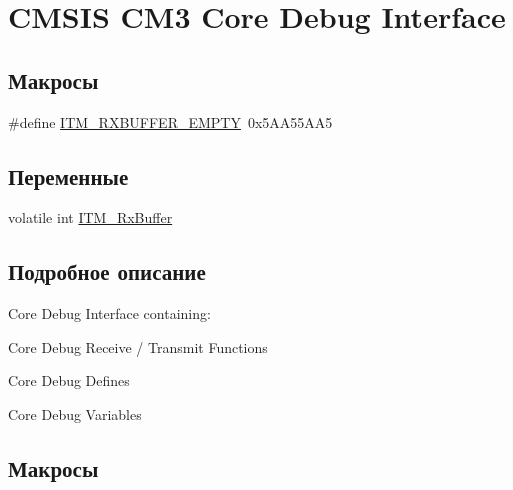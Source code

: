 \hypertarget{group___c_m_s_i_s___c_m3___core_debug_interface}{}\section{C\+M\+S\+IS C\+M3 Core Debug Interface}
\label{group___c_m_s_i_s___c_m3___core_debug_interface}
\subsection*{Макросы}
\begin{DoxyCompactItemize}
\item 
\#define \mbox{\hyperlink{group___c_m_s_i_s___c_m3___core_debug_interface_gaa822cb398ee022b59e9e6c5d7bbb228a}{I\+T\+M\+\_\+\+R\+X\+B\+U\+F\+F\+E\+R\+\_\+\+E\+M\+P\+TY}}~0x5\+A\+A55\+A\+A5
\end{DoxyCompactItemize}
\subsection*{Переменные}
\begin{DoxyCompactItemize}
\item 
volatile int \mbox{\hyperlink{group___c_m_s_i_s___c_m3___core_debug_interface_gacf1fe3063cedf11b6e6f7cb0dd7c1a51}{I\+T\+M\+\_\+\+Rx\+Buffer}}
\end{DoxyCompactItemize}


\subsection{Подробное описание}
Core Debug Interface containing\+:
\begin{DoxyItemize}
\item Core Debug Receive / Transmit Functions
\item Core Debug Defines
\item Core Debug Variables 
\end{DoxyItemize}

\subsection{Макросы}
\mbox{\label{group___c_m_s_i_s___c_m3___core_debug_interface_gaa822cb398ee022b59e9e6c5d7bbb228a}} 
